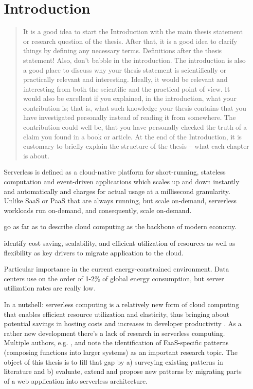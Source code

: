 \documentclass[utf8,english]{gradu3}
\begin{document}
\mainmatter

\chapter{Introduction}

\begin{quote}
It is a good idea to start the Introduction with the main thesis statement or research question of the thesis.  After that, it is a good idea to clarify things by defining any necessary terms. Definitions after the thesis statement!  Also, don't babble in the introduction. The introduction is also a good place to discuss why your thesis statement is scientifically or practically relevant and interesting.  Ideally, it would be relevant and interesting from both the scientific and the practical point of view. It would also be excellent if you explained, in the introduction, what your contribution is; that is, what such knowledge your thesis contains that you have investigated personally instead of reading it from somewhere. The contribution could well be, that you have personally checked the truth of a claim you found in a book or article.  At the end of the Introduction, it is customary to briefly explain the structure of the thesis -- what each chapter is about.
\end{quote}

Serverless is defined as a cloud-native platform for short-running, stateless computation and event-driven applications which scales up and down instantly and automatically and charges for actual usage at a millisecond granularity. Unlike SaaS or PaaS that are always running, but scale on-demand, serverless workloads run on-demand, and consequently, scale on-demand.

\textcite{buyya2017manifesto} go as far as to describe cloud computing as the backbone of modern economy.

\textcite{jamshidi13cloudmigrationreview} identify cost saving, scalability, and efficient utilization of resources as well as flexibility as key drivers to migrate application to the cloud.

Particular importance in the current energy-constrained environment. Data centers use on the order of 1-2\% of global energy consumption, but server utilization rates are really low. \parencite{horner16powerusage}

In a nutshell: serverless computing is a relatively new form of cloud computing that enables efficient resource utilization and elasticity, thus bringing about potential savings in hosting costs and increases in developer productivity \parencite{robert2016serverlessarchitectures}. As a rather new development there's a lack of research in serverless computing. Multiple authors, e.g. \textcite{baldini17currentTrends}, \textcite{fox17} and \textcite{van2017spec} note the identification of FaaS-specific patterns (composing functions into larger systems) as an important research topic. The object of this thesis is to fill that gap by a) surveying existing patterns in literature and b) evaluate, extend and propose new patterns by migrating parts of a web application into serverless architecture.
\end{document}
